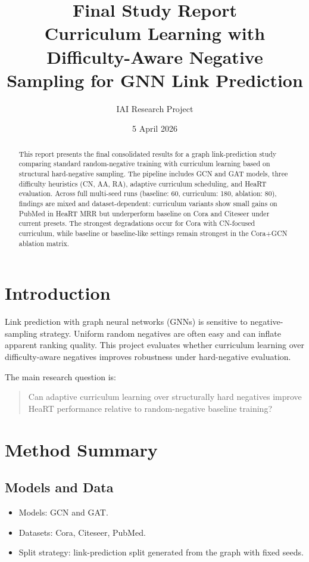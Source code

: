 \documentclass[11pt]{article}
\title{Final Study Report\\Curriculum Learning with Difficulty-Aware Negative Sampling for GNN Link Prediction}
\author{IAI Research Project}
\date{5 April 2026}
\begin{document}
\maketitle

\begin{abstract}
This report presents the final consolidated results for a graph link-prediction study comparing standard random-negative training with curriculum learning based on structural hard-negative sampling. The pipeline includes GCN and GAT models, three difficulty heuristics (CN, AA, RA), adaptive curriculum scheduling, and HeaRT evaluation. Across full multi-seed runs (baseline: 60, curriculum: 180, ablation: 80), findings are mixed and dataset-dependent: curriculum variants show small gains on PubMed in HeaRT MRR but underperform baseline on Cora and Citeseer under current presets. The strongest degradations occur for Cora with CN-focused curriculum, while baseline or baseline-like settings remain strongest in the Cora+GCN ablation matrix.
\end{abstract}

\section{Introduction}

Link prediction with graph neural networks (GNNs) is sensitive to negative-sampling strategy. Uniform random negatives are often easy and can inflate apparent ranking quality. This project evaluates whether curriculum learning over difficulty-aware negatives improves robustness under hard-negative evaluation.

The main research question is:

\begin{quote}
Can adaptive curriculum learning over structurally hard negatives improve HeaRT performance relative to random-negative baseline training?
\end{quote}

\section{Method Summary}

\subsection{Models and Data}

\begin{itemize}
\item Models: GCN and GAT.
\item Datasets: Cora, Citeseer, PubMed.
\item Split strategy: link-prediction split generated from the graph with fixed seeds.
\end{itemize}
\end{document}
